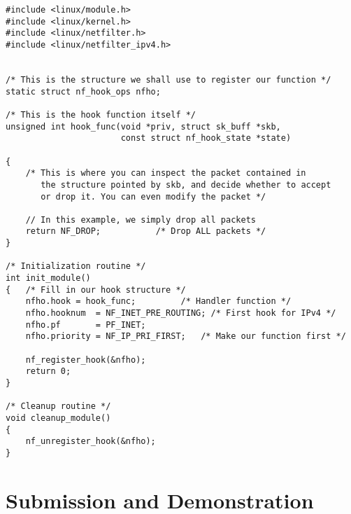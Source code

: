 \begin{lstlisting}
#include <linux/module.h>
#include <linux/kernel.h>
#include <linux/netfilter.h>
#include <linux/netfilter_ipv4.h>


/* This is the structure we shall use to register our function */
static struct nf_hook_ops nfho;

/* This is the hook function itself */
unsigned int hook_func(void *priv, struct sk_buff *skb, 
                       const struct nf_hook_state *state)

{
    /* This is where you can inspect the packet contained in
       the structure pointed by skb, and decide whether to accept 
       or drop it. You can even modify the packet */

    // In this example, we simply drop all packets
    return NF_DROP;           /* Drop ALL packets */
}

/* Initialization routine */
int init_module()
{   /* Fill in our hook structure */
    nfho.hook = hook_func;         /* Handler function */
    nfho.hooknum  = NF_INET_PRE_ROUTING; /* First hook for IPv4 */
    nfho.pf       = PF_INET;
    nfho.priority = NF_IP_PRI_FIRST;   /* Make our function first */

    nf_register_hook(&nfho);
    return 0;
}

/* Cleanup routine */
void cleanup_module()
{
    nf_unregister_hook(&nfho);
}
\end{lstlisting}




\section{Submission and Demonstration}


\seedsubmission







